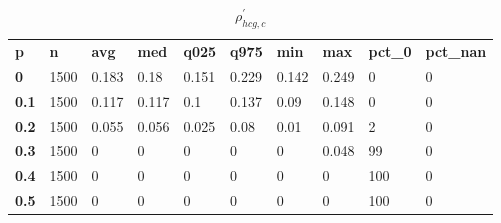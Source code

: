 \begin{table}[h]
 \centering 
\footnotesize
\caption{$\rho_{hcg,c}^\prime $}
\label{tab:alphahcgc}
\begin{tabular}[h]{| l l l l l l l l l l|
    } \hline
\textbf{ p} & \textbf{ n} & \textbf{ avg} & \textbf{ med} & \textbf{ q025} & \textbf{ q975} & \textbf{ min} & \textbf{ max} & \textbf{ pct\_0} & \textbf{ pct\_nan}
           \\
  \textbf{  0} & 1500 & 0.183 &  0.18 & 0.151 & 0.229 & 0.142 & 0.249 &   0 & 0
           \\
  \textbf{0.1} & 1500 & 0.117 & 0.117 &   0.1 & 0.137 &  0.09 & 0.148 &   0 & 0
           \\
  \textbf{0.2} & 1500 & 0.055 & 0.056 & 0.025 &  0.08 &  0.01 & 0.091 &   2 & 0
           \\
  \textbf{0.3} & 1500 &     0 &     0 &     0 &     0 &     0 & 0.048 &  99 & 0
           \\
  \textbf{0.4} & 1500 &     0 &     0 &     0 &     0 &     0 &     0 & 100 & 0
           \\
  \textbf{0.5} & 1500 &     0 &     0 &     0 &     0 &     0 &     0 & 100 & 0
           \\
 \hline \end{tabular}
 \end{table}
